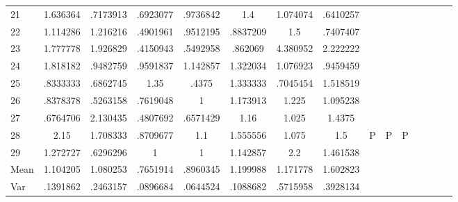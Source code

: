 \documentclass[a4paper,12pt]{article}
\begin{document}
\begin{landscape}
\begin{footnotesize}
\begin{center}
\begin{longtable}{lcccccccccccccc|}
21&1.636364&.7173913&.6923077&.9736842&1.4&1.074074&.6410257&&&&&&& \\
22&1.114286&1.216216&.4901961&.9512195&.8837209&1.5&.7407407&&&&&&& \\
23&1.777778&1.926829&.4150943&.5492958&.862069&4.380952&2.222222&&&&&&& \\
24&1.818182&.9482759&.9591837&1.142857&1.322034&1.076923&.9459459&&&&&&& \\
25&.8333333&.6862745&1.35&.4375&1.333333&.7045454&1.518519&&&&&&& \\
26&.8378378&.5263158&.7619048&1&1.173913&1.225&1.095238&&&&&&& \\
27&.6764706&2.130435&.4807692&.6571429&1.16&1.025&1.4375&&&&&&& \\
28&2.15&1.708333&.8709677&1.1&1.555556&1.075&1.5&P&P&P&&&& \\
29&1.272727&.6296296&1&1&1.142857&2.2&1.461538&&&&&&& \\
Mean&1.104205&1.080253&.7651914&.8960345&1.199988&1.171778&1.602823&&&&&&& \\
Var&.1391862&.2463157&.0896684&.0644524&.1088682&.5715958&.3928134&&&&&&& \\ \hline
\end{longtable}
\end{center}
\end{footnotesize}
\end{landscape}
\end{document}

